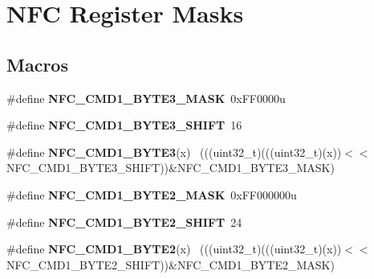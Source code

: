 \hypertarget{group___n_f_c___register___masks}{}\section{N\+F\+C Register Masks}
\label{group___n_f_c___register___masks}
\subsection*{Macros}
\begin{DoxyCompactItemize}
\item 
\hypertarget{group___n_f_c___register___masks_gab315b207c996876097e9c816a69ddc21}{}\#define {\bfseries N\+F\+C\+\_\+\+C\+M\+D1\+\_\+\+B\+Y\+T\+E3\+\_\+\+M\+A\+S\+K}~0x\+F\+F0000u\label{group___n_f_c___register___masks_gab315b207c996876097e9c816a69ddc21}

\item 
\hypertarget{group___n_f_c___register___masks_ga9094b877d17b606cf7e1b1daaa5f33f6}{}\#define {\bfseries N\+F\+C\+\_\+\+C\+M\+D1\+\_\+\+B\+Y\+T\+E3\+\_\+\+S\+H\+I\+F\+T}~16\label{group___n_f_c___register___masks_ga9094b877d17b606cf7e1b1daaa5f33f6}

\item 
\hypertarget{group___n_f_c___register___masks_ga5ed5adfe0159702bbecc75c780a65d62}{}\#define {\bfseries N\+F\+C\+\_\+\+C\+M\+D1\+\_\+\+B\+Y\+T\+E3}(x)                                            ~(((uint32\+\_\+t)(((uint32\+\_\+t)(x))$<$$<$N\+F\+C\+\_\+\+C\+M\+D1\+\_\+\+B\+Y\+T\+E3\+\_\+\+S\+H\+I\+F\+T))\&N\+F\+C\+\_\+\+C\+M\+D1\+\_\+\+B\+Y\+T\+E3\+\_\+\+M\+A\+S\+K)\label{group___n_f_c___register___masks_ga5ed5adfe0159702bbecc75c780a65d62}

\item 
\hypertarget{group___n_f_c___register___masks_gabdd22eb41619d9857dd7c7ba9650fd0f}{}\#define {\bfseries N\+F\+C\+\_\+\+C\+M\+D1\+\_\+\+B\+Y\+T\+E2\+\_\+\+M\+A\+S\+K}~0x\+F\+F000000u\label{group___n_f_c___register___masks_gabdd22eb41619d9857dd7c7ba9650fd0f}

\item 
\hypertarget{group___n_f_c___register___masks_gaf8d21464b2ae6925e3e2b83a8c6811c9}{}\#define {\bfseries N\+F\+C\+\_\+\+C\+M\+D1\+\_\+\+B\+Y\+T\+E2\+\_\+\+S\+H\+I\+F\+T}~24\label{group___n_f_c___register___masks_gaf8d21464b2ae6925e3e2b83a8c6811c9}

\item 
\hypertarget{group___n_f_c___register___masks_ga82045777705e3bbed7e7dd660f93b86a}{}\#define {\bfseries N\+F\+C\+\_\+\+C\+M\+D1\+\_\+\+B\+Y\+T\+E2}(x)                                            ~(((uint32\+\_\+t)(((uint32\+\_\+t)(x))$<$$<$N\+F\+C\+\_\+\+C\+M\+D1\+\_\+\+B\+Y\+T\+E2\+\_\+\+S\+H\+I\+F\+T))\&N\+F\+C\+\_\+\+C\+M\+D1\+\_\+\+B\+Y\+T\+E2\+\_\+\+M\+A\+S\+K)\label{group___n_f_c___register___masks_ga82045777705e3bbed7e7dd660f93b86a}


\end{DoxyCompactItemize}
